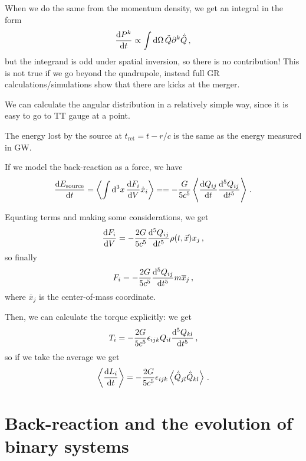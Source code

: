 \documentclass[main.tex]{subfiles}
\begin{document}
When we do the same from the momentum density, we get an integral in the form 
%
\begin{align}
\dv{P^{k}}{t} \propto \int \dd{\Omega } \ddot{Q} \partial^{k} \dot{\ddot{Q}}
\,,
\end{align}
%
but the integrand is odd under spatial inversion, so there is no contribution! This is not true if we go beyond the quadrupole, instead full GR calculations/simulations show that there are kicks at the merger. 

We can calculate the angular distribution in a relatively simple way, since it is easy to go to TT gauge at a point. 

The energy lost by the source at \(t _{\text{ret}} = t - r/c \) is the same as the energy measured in GW. 

If we model the back-reaction as a force, we have 
%
\begin{align}
\dv{E _{\text{source}}}{t} = 
\expval{\int  \dd[3]{x} \dv{F_i}{V} \dot{x}_{i}} = 
= - \frac{G}{5 c^{5}} \expval{\dv{Q_{ij}}{t} \dv[5]{Q_{ij}}{t}}
\,.
\end{align}

Equating terms and making some considerations, we get 
%
\begin{align}
\dv{F_{i}}{V} = - \frac{2G}{5c^{5}} \dv[5]{Q_{ij}}{t} \rho (t, \vec{x}) x_{j}
\,,
\end{align}
%
so finally 
%
\begin{align}
F_{i} = - \frac{2G}{5c^{5}} \dv[5]{Q_{ij}}{t} m \overline{x}_{j}
\,,
\end{align}
%
where \(\overline{x}_{j} \) is the center-of-mass coordinate. 

Then, we can calculate the torque explicitly: we get 
%
\begin{align}
T_{i} = - \frac{2G}{5c^{5}} \epsilon_{ijk} Q_{il} \dv[5]{Q_{kl}}{t}
\,,
\end{align}
%
so if we take the average we get 
%
\begin{align}
\expval{\dv{L_{i}}{t}} = -\frac{2G}{5c^{5}} \epsilon_{ijk} 
\expval{\dot{\ddot{Q}}_{jl} \dot{\ddot{Q}}_{kl}}
\,.
\end{align}

\section{Back-reaction and the evolution of binary systems}
\end{document}
